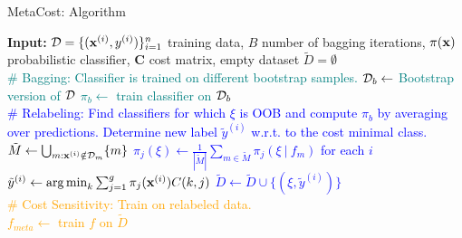 \documentclass[11pt,compress,t,notes=noshow, xcolor=table]{beamer}
\begin{document}
\begin{vbframe}{MetaCost: Algorithm}
	
		

		
			\begin{algorithmic}
				
				\scriptsize

				\State \textbf{Input:} 
				$\mathcal{D} = \{(\mathbf{x}^{(i)},y^{(i)})\}_{i=1}^n$ training data, $B$ number of bagging iterations,
				$\pi(\mathbf{x})$ probabilistic classifier,
				$\mathbf{C}$ cost matrix, empty dataset $\tilde D = \emptyset$ \\
				 \textcolor{teal}{\# Bagging: Classifier is trained on different bootstrap samples.
    \State $\mathcal{D}_b \leftarrow $ Bootstrap version of $\mathcal{D}$
    \State $\pi_b \leftarrow $ train classifier on $\mathcal{D}_b$ 
\EndFor 
\\
\textcolor{blue}{\# Relabeling: Find classifiers for which $\xi$ is OOB and compute $\pi_b$ by averaging over predictions.
Determine new label $\tilde y^{(i)}$ w.r.t. to the cost minimal class.
 	 \State $\tilde M \leftarrow \bigcup_{m: \mathbf{x}^{(i)} \notin \mathcal{D}_m} \{m\}$ 
\EndFor
        \State $\pi_j(\xi)  \leftarrow \frac{1}{|\tilde M| } \sum_{m \in \tilde M}   \pi_j(\xi~|~ f_m)$ for each $i$ 
    \EndFor
{}
\State $\tilde y^{(i)} \leftarrow \operatorname{arg\,min}_{k} \sum_{j=1}^g \pi_j(\mathbf{x}^{(i)}) C(k,j) $
\State $\tilde D \leftarrow \tilde D \cup \{(\xi,\tilde y^{(i)})\} $
\EndFor}}  
\\
\textcolor{orange}{\# Cost Sensitivity: Train on relabeled data.\\
$f_{meta} \leftarrow$ train $f$ on $\tilde D$}
\end{algorithmic}

\end{vbframe}

\endlecture
\end{document}
